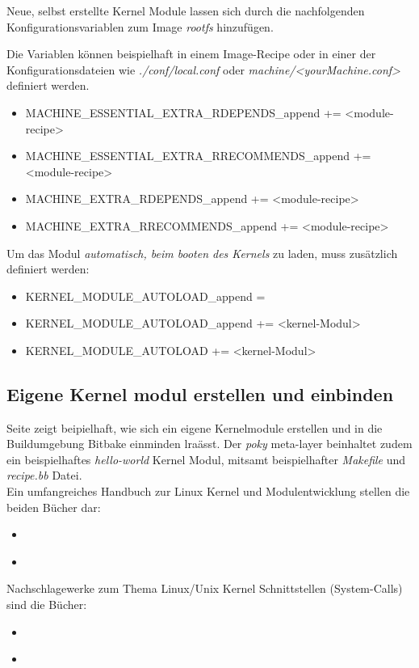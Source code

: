 Neue, selbst erstellte Kernel Module lassen sich durch die nachfolgenden
Konfigurations\-variablen zum Image \textit{rootfs} hinzufügen.

Die Variablen können beispielhaft in einem Image-Recipe oder in einer der
Konfigurationsdateien wie \textit{./conf/local.conf} oder
\textit{machine/<yourMachine.conf>}  definiert werden.

\begin{itemize}
    \item MACHINE\_ESSENTIAL\_EXTRA\_RDEPENDS\_append +=  <module-recipe>
    \item MACHINE\_ESSENTIAL\_EXTRA\_RRECOMMENDS\_append += <module-recipe>
    \item MACHINE\_EXTRA\_RDEPENDS\_append += <module-recipe>
    \item MACHINE\_EXTRA\_RRECOMMENDS\_append += <module-recipe>
\end{itemize}

Um das Modul \textit{automatisch, beim booten des Kernels} zu laden, muss
zusätzlich definiert werden:

\begin{itemize}
    \item KERNEL\_MODULE\_AUTOLOAD\_append =  \grqq
    \item KERNEL\_MODULE\_AUTOLOAD\_append += <kernel-Modul>
    \item KERNEL\_MODULE\_AUTOLOAD += <kernel-Modul>
\end{itemize}


\subsection{Eigene Kernel modul erstellen und einbinden}%
\label{sub:eigene_kernel_modul_erstellen_und_einbinden}


Seite \cite[121-125]{Gonzalez2018:Embedded_Linux_Development_Using_Yocto_Project_Cookbook_2nd}
zeigt beipielhaft, wie sich ein eigene Kernelmodule erstellen und in die
Buildumgebung Bitbake einminden lraässt. Der \textit{poky} meta-layer beinhaltet
zudem ein beispielhaftes \textit{hello-world} Kernel Modul, mitsamt
beispielhafter \textit{Makefile} und \textit{recipe.bb} Datei.
\\
Ein umfangreiches Handbuch zur Linux Kernel und Modulentwicklung stellen die
beiden Bücher dar:
\begin{itemize}
    \item \cite{Quade2015}
    \item \cite{Corbet2005}
\end{itemize}

Nachschlagewerke zum Thema Linux/Unix Kernel Schnittstellen (System-Calls) sind
die Bücher:
\begin{itemize}
    \item \cite{Kerrisk2010}
    \item \cite{Rago2013}
\end{itemize}
